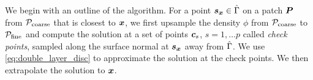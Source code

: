 We begin with an outline of the algorithm.
For a point ${\bm{s}_{\bm{x}}} \in \hat{\Gamma}$ on a patch ${\bm{P}}$ from ${\mathcal{P}_{\mathrm{coarse}}}$ that is closest to ${\bm{x}}$, we first upsample the density $\phi$ from ${\mathcal{P}_{\mathrm{coarse}}}$ to ${\mathcal{P}_{\mathrm{fine}}}$ and compute the solution at a set of points ${\bm{c}}_s$, $s = 1, \hdots p$ called \emph{check points}, sampled along the surface normal at ${\bm{s}_{\bm{x}}}$ away from $\hat{\Gamma}$. 
We use \cref{eq:double_layer_disc} to approximate the solution at the check points.
We then extrapolate the solution to ${\bm{x}}$.


